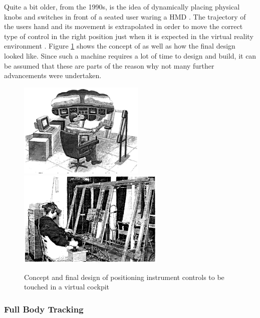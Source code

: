 Quite a bit older, from the 1990s, is the idea of dynamically placing physical knobs and switches in front of a seated user waring a HMD \citep{Latham1997}. The trajectory of the users hand and its movement is extrapolated in order to move the correct type of control in the right position just when it is expected in the virtual reality environment \citep{Latham1997}. Figure \ref{fig:touchcockpit} shows the concept of \cite{Latham1997} as well as how the final design looked like. Since such a machine requires a lot of time to design and build, it can be assumed that these are parts of the reason why not many further advancements were undertaken.
\begin{figure}[h]
	\begin{center}
		\includegraphics[width=6cm]{03_Figures/05_LitReview/Latham1997_Concept.png}
		\includegraphics[width=7cm]{03_Figures/05_LitReview/Latham1997_FinalDesign.png}
		\caption[Concept and final design of positioning instrument controls to be touched in a virtual cockpit]{Concept and final design of positioning instrument controls to be touched in a virtual cockpit \citep{Latham1997}}
		\label{fig:touchcockpit}
	\end{center}
\end{figure}


\subsubsection{Full Body Tracking}

